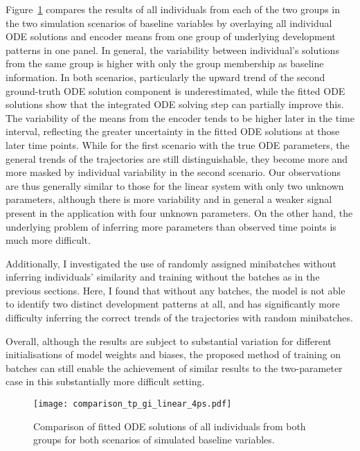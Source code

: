 Figure~\ref{fig:apps-comparison_tp_gi_allinds_linear4ps} compares the results of all individuals from each of the two groups in the two simulation scenarios of baseline variables by overlaying all individual ODE solutions and encoder means from one group of underlying development patterns in one panel. In general, the variability between individual's solutions from the same group is higher with only the group membership as baseline information. In both scenarios, particularly the upward trend of the second ground-truth ODE solution component is underestimated, while the fitted ODE solutions show that the integrated ODE solving step can partially improve this. 
The variability of the means from the encoder tends to be higher later in the time interval, reflecting the greater uncertainty in the fitted ODE solutions at those later time points. While for the first scenario with the true ODE parameters, the general trends of the trajectories are still distinguishable, they become more and more masked by individual variability in the second scenario.
Our observations are thus generally similar to those for the linear system with only two unknown parameters, although there is more variability and in general a weaker signal present in the application with four unknown parameters. On the other hand, the underlying problem of inferring more parameters than observed time points is much more difficult.

Additionally, I investigated the use of randomly assigned minibatches without inferring individuals' similarity and training without the batches as in the previous sections. Here, I found that without any batches, the model is not able to identify two distinct development patterns at all, and has significantly more difficulty inferring the correct trends of the trajectories with random minibatches. 

Overall, although the results are subject to substantial variation for different initialisations of model weights and biases, the proposed method of training on batches can still enable the achievement of similar results to the two-parameter case in this substantially more difficult setting. 

\begin{figure}
	\texttt{[image: comparison\_tp\_gi\_linear\_4ps.pdf]}
	\caption{Comparison of fitted ODE solutions of all individuals from both groups for both scenarios of simulated baseline variables.}
	\label{fig:apps-comparison_tp_gi_allinds_linear4ps}
\end{figure}